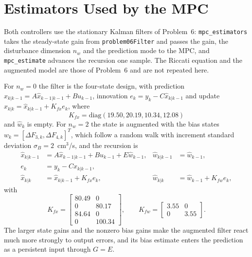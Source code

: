 \section{Estimators Used by the MPC}
\label{sec:p8-estimators}

Both controllers use the stationary Kalman filters of Problem~6:
\texttt{mpc\_estimators} takes the steady-state gain from
\texttt{problem06Filter} and passes the gain, the disturbance dimension $n_w$ and
the prediction mode to the MPC, and \texttt{mpc\_estimate} advances the recursion
one sample. The Riccati equation and the augmented model are those of Problem~6
and are not repeated here.

For $n_w=0$ the filter is the four-state design, with prediction
$\hat x_{k|k-1}=A\hat x_{k-1|k-1}+Bu_{k-1}$, innovation
$e_k=y_k-C\hat x_{k|k-1}$ and update $\hat x_{k|k}=\hat x_{k|k-1}+K_{fx}e_k$,
where
\begin{equation}
 K_{fx}=\mathrm{diag}(19.50,20.19,10.34,12.08)
 \label{eq:p8-kf4-gain}
\end{equation}
and $\hat w_k$ is empty. For $n_w=2$ the state is augmented with the bias states
$w_k=[\Delta F_{3,k},\Delta F_{4,k}]^T$, which follow a random walk with
increment standard deviation $\sigma_B=2$~cm$^3$/s, and the recursion is
\begin{align}
 \hat x_{k|k-1}&=A\hat x_{k-1|k-1}+Bu_{k-1}+E\hat w_{k-1},
 & \hat w_{k|k-1}&=\hat w_{k-1},
 \label{eq:p8-kf6-pred}\\
 e_k&=y_k-C\hat x_{k|k-1},
 \label{eq:p8-kf6-innov}\\
 \hat x_{k|k}&=\hat x_{k|k-1}+K_{fx}e_k,
 & \hat w_{k|k}&=\hat w_{k-1}+K_{fw}e_k,
 \label{eq:p8-kf6-update}
\end{align}
with
\begin{equation}
 K_{fx}=\begin{bmatrix}80.49&0\\ 0&80.17\\ 84.64&0\\ 0&100.34\end{bmatrix},
 \qquad
 K_{fw}=\begin{bmatrix}3.55&0\\ 0&3.55\end{bmatrix}.
 \label{eq:p8-kf6-gains}
\end{equation}
The larger state gains and the nonzero bias gains make the augmented filter react
much more strongly to output errors, and its bias estimate enters the prediction
as a persistent input through $G=E$.

